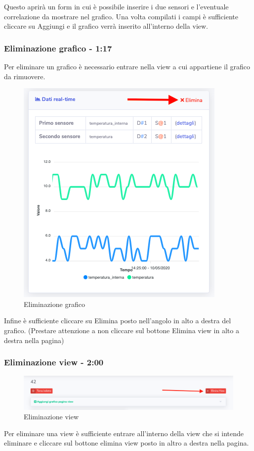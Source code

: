		Questo aprirà un form in cui è possibile inserire i due sensori e l'eventuale correlazione da mostrare nel grafico. Una volta compilati i campi è sufficiente cliccare su Aggiungi e il grafico verrà inserito all'interno della view.

	\subsubsection{Eliminazione grafico - 1:17}
		Per eliminare un grafico è necessario entrare nella view a cui appartiene il grafico da rimuovere. 
		\begin{figure}[H]
		\centering
		\includegraphics[scale=0.600]{res/images/membro/eliminazGrafico.png}
		\caption{Eliminazione grafico}
		\end{figure}
		Infine è sufficiente cliccare su Elimina posto nell'angolo in alto a destra del grafico. (Prestare attenzione a non cliccare sul bottone Elimina view in alto a destra nella pagina)

	\subsubsection{Eliminazione view - 2:00}
		\begin{figure}[H]
		\centering
		\includegraphics[scale=0.600]{res/images/membro/eliminazView.png}
		\caption{Eliminazione view}
		\end{figure}
		Per eliminare una view è sufficiente entrare all'interno della view che si intende eliminare e cliccare sul bottone elimina view posto in altro a destra nella pagina.
	

